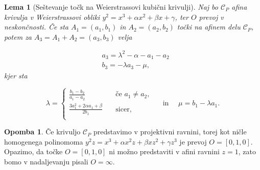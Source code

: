 \documentclass[12pt,a4paper,twoside]{article}
\theoremstyle{definition} %
\newtheorem{opomba}[definicija]{Opomba}
\theoremstyle{plain} %
\newtheorem{lema}[definicija]{Lema}
\numberwithin{equation}{section}  %
\begin{document}
\begin{lema}[Seštevanje točk na Weierstrassovi kubični krivulji]
\label{sestevanje}
Naj bo $\mathcal{C}_P$ afina krivulja v Weierstrassovi obliki $y^2 = x^3 + \alpha x^2 + \beta x + \gamma$, ter $O$ prevoj v neskončnosti. Če sta $A_1 = (a_1,b_1)$ in $A_2 = (a_2,b_2)$ točki na afinem delu $\mathcal{C}_P$, potem za $A_3 = A_1 + A_2 = (a_3,b_3)$ velja

\begin{align}
&{} a_3 = \lambda ^2 - \alpha - a_1 - a_2 \nonumber \\
&{} b_3 = -\lambda a_3 - \mu, \nonumber
\end{align}
kjer sta 

$$
\lambda =
\begin{cases}
\frac{b_1 - b_2}{a_1 - a_2} & \quad \text{če } a_1 \neq a_2 ,\\
\frac{3a_1^2+ 2 \alpha a_1 + \beta}{2b_1} & \quad \text{sicer} ,\\
\end{cases}
\quad
\text{ in }
\quad
\mu = b_1 - \lambda a_1.
$$

%

\end{lema}


\begin{opomba}
Če krivuljo $\mathcal{C}_P$ predstavimo v projektivni ravnini, torej kot ničle homogenega polinomoma $y^2z=x^3+\alpha x^2z+\beta xz^2+ \gamma z^3$ je prevoj $O=[0,1,0].$
Opazimo, da točke $O = [0,1,0]$ ni možno predstaviti v afini ravnini $z=1$, zato bomo v nadaljevanju pisali $O = \infty$.
\end{opomba}
\end{document}
